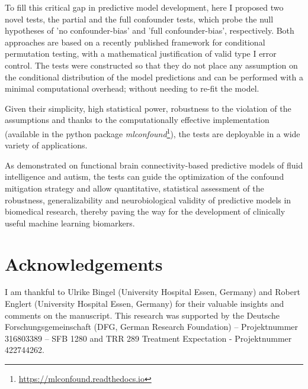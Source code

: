 \documentclass{article}
\begin{document}
To fill this critical gap in predictive model development, here I proposed two novel tests, the partial and the full confounder tests, which probe the null hypotheses of 'no confounder-bias' and 'full confounder-bias', respectively. Both approaches are based on a recently published framework for conditional permutation testing, with a mathematical justification of valid type I error control. The tests were constructed so that they do not place any assumption on the conditional distribution of the model predictions and can be performed with a minimal computational overhead; without needing to re-fit the model.

Given their simplicity, high statistical power, robustness to the violation of the assumptions and thanks to the computationally effective implementation (available in the  python package \emph{mlconfound}\footnote{\href{https://mlconfound.readthedocs.io}{https://mlconfound.readthedocs.io}}), the tests are deployable in a wide variety of applications.

As demonstrated on functional brain connectivity-based predictive models of fluid intelligence and autism, the tests can guide the optimization of the confound mitigation strategy and allow quantitative, statistical assessment of the robustness, generalizability and neurobiological validity of predictive models in biomedical research, thereby paving the way for the development of clinically useful machine learning biomarkers.

\section{Acknowledgements}
I am thankful to Ulrike Bingel (University Hospital Essen, Germany) and Robert Englert (University Hospital Essen, Germany) for their valuable insights and comments on the manuscript. This research was supported by the Deutsche Forschungsgemeinschaft (DFG, German Research Foundation) – Projektnummer 316803389 – SFB 1280  and TRR 289 Treatment Expectation - Projektnummer 422744262.

  


\newpage

\end{document}

